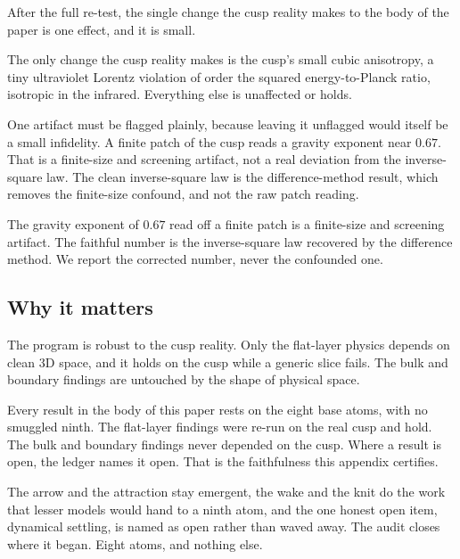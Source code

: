 After the full re-test, the single change the cusp reality makes to the body of the paper is one effect, and it is small.

\begin{result}
The only change the cusp reality makes is the cusp's small cubic anisotropy, a tiny ultraviolet Lorentz violation of order the squared energy-to-Planck ratio, isotropic in the infrared. Everything else is unaffected or holds.
\end{result}

One artifact must be flagged plainly, because leaving it unflagged would itself be a small infidelity. A finite patch of the cusp reads a gravity exponent near $0.67$. That is a finite-size and screening artifact, not a real deviation from the inverse-square law. The clean inverse-square law is the difference-method result, which removes the finite-size confound, and not the raw patch reading.

\begin{principle}
The gravity exponent of $0.67$ read off a finite patch is a finite-size and screening artifact. The faithful number is the inverse-square law recovered by the difference method. We report the corrected number, never the confounded one.
\end{principle}

\subsection{Why it matters}

The program is robust to the cusp reality. Only the flat-layer physics depends on clean $3$D space, and it holds on the cusp while a generic slice fails. The bulk and boundary findings are untouched by the shape of physical space.

\begin{result}
Every result in the body of this paper rests on the eight base atoms, with no smuggled ninth. The flat-layer findings were re-run on the real cusp and hold. The bulk and boundary findings never depended on the cusp. Where a result is open, the ledger names it open. That is the faithfulness this appendix certifies.
\end{result}

The arrow and the attraction stay emergent, the wake and the knit do the work that lesser models would hand to a ninth atom, and the one honest open item, dynamical settling, is named as open rather than waved away. The audit closes where it began. Eight atoms, and nothing else.
